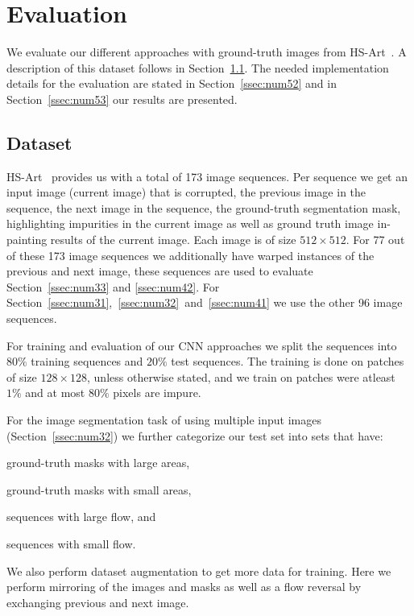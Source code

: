 \section{Evaluation}
\label{sec:num5}

We evaluate our different approaches with ground-truth images from HS-Art~\cite{hs-art}. A description of this dataset follows in Section~\ref{ssec:num51}. The needed implementation details for the evaluation are stated in Section~\ref{ssec:num52} and in Section~\ref{ssec:num53} our results are presented.

\subsection{Dataset}
\label{ssec:num51}
HS-Art~\cite{hs-art} provides us with a total of 173 image sequences. Per sequence we get an input image (current image) that is corrupted, the previous image in the sequence, the next image in the sequence, the ground-truth segmentation mask, highlighting impurities in the current image as well as ground truth image in-painting results of the current image. Each image is of size $512 \times 512$. For 77 out of these 173 image sequences we additionally have warped instances of the previous and next image, these sequences are used to evaluate Section~\ref{ssec:num33} and \ref{ssec:num42}. For Section~\ref{ssec:num31},~\ref{ssec:num32}~and~\ref{ssec:num41} we use the other 96 image sequences.

For training and evaluation of our CNN approaches we split the sequences into $80\%$ training sequences and $20\%$ test sequences. The training is done on patches of size $128 \times 128$, unless otherwise stated, and we train on patches were atleast $1\%$ and at most $80\%$ pixels are impure.

For the image segmentation task of using multiple input images (Section~\ref{ssec:num32}) we further categorize our test set into sets that have: \begin{enumerate*}[label=(\roman*)] \item ground-truth masks with large areas, \item ground-truth masks with small areas, \item sequences with large flow, and \item sequences with small flow.\end{enumerate*}

We also perform dataset augmentation to get more data for training. Here we perform mirroring of the images and masks as well as a flow reversal by exchanging previous and next image.


